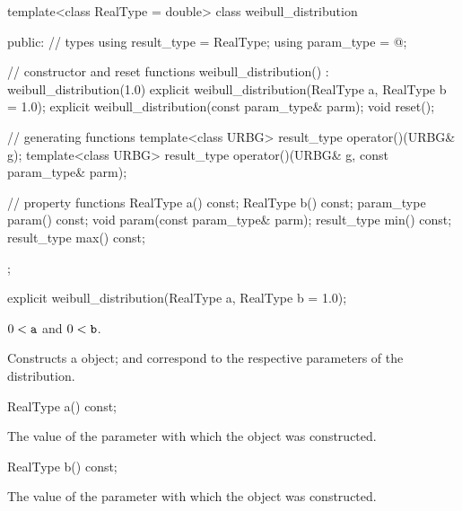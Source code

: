 %
\begin{codeblock}
template<class RealType = double>
  class weibull_distribution {
  public:
    // types
    using result_type = RealType;
    using param_type  = @\unspec@;

    // constructor and reset functions
    weibull_distribution() : weibull_distribution(1.0) {}
    explicit weibull_distribution(RealType a, RealType b = 1.0);
    explicit weibull_distribution(const param_type& parm);
    void reset();

    // generating functions
    template<class URBG>
      result_type operator()(URBG& g);
    template<class URBG>
      result_type operator()(URBG& g, const param_type& parm);

    // property functions
    RealType a() const;
    RealType b() const;
    param_type param() const;
    void param(const param_type& parm);
    result_type min() const;
    result_type max() const;
  };
\end{codeblock}

%
\begin{itemdecl}
explicit weibull_distribution(RealType a, RealType b = 1.0);
\end{itemdecl}%

\begin{itemdescr}
\pnum
\requires $0 < \texttt{a}$ and $0 < \texttt{b}$.

\pnum
\effects Constructs a  object;
 and 
correspond to the respective parameters of the distribution.
\end{itemdescr}

%
\begin{itemdecl}
RealType a() const;
\end{itemdecl}

\begin{itemdescr}
\pnum\returns The value of the  parameter
 with which the object was constructed.
\end{itemdescr}

%
\begin{itemdecl}
RealType b() const;
\end{itemdecl}

\begin{itemdescr}
\pnum\returns The value of the  parameter
 with which the object was constructed.
\end{itemdescr}

